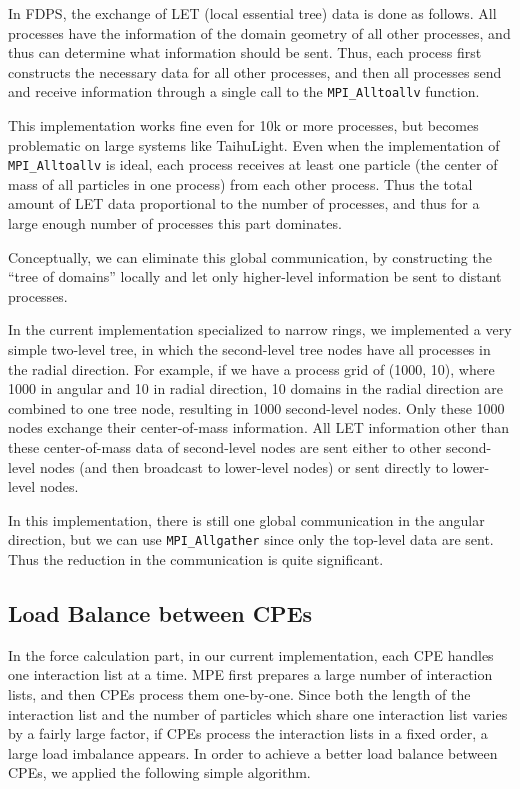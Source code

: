 \documentclass[oribibl]{llncs}
\begin{document}
In FDPS, the exchange of LET (local essential tree) data is done as
follows. All processes have the information of the domain geometry of
all other processes, and thus can determine what information should be
sent. Thus, each process first constructs the necessary data for all
other processes, and then all processes send and receive information
through a single call to the {\tt MPI\_Alltoallv} function.

This implementation works fine even for 10k or more processes, but
becomes problematic on large systems like TaihuLight. Even when the
implementation of {\tt MPI\_Alltoallv} is ideal, each process
receives at least one particle (the center of mass of all particles in
one process) from each other process. Thus the total amount of LET
data proportional to the number of processes, and thus
for a large enough number of processes this part dominates.

Conceptually, we can eliminate this global communication, by
constructing the ``tree of domains'' locally and let only higher-level
information be sent to distant processes.

In the current implementation specialized to narrow rings, we
implemented a very simple two-level tree, in which the second-level
tree nodes have all processes in the radial direction. For example, if we
have a process grid of (1000, 10), where 1000 in angular and 10 in
radial direction, 10 domains in the radial direction are combined to
one tree node, resulting in 1000 second-level nodes. Only these 1000
nodes exchange their center-of-mass information. All LET information
other than these center-of-mass data of second-level nodes are sent
either to other second-level nodes (and then broadcast to
lower-level nodes) or sent directly to lower-level nodes.

In this implementation, there is still one global communication in the
angular direction, but we can use {\tt MPI\_Allgather} since only the
top-level data are sent. Thus the reduction in the communication is
quite significant.


\subsection{Load Balance between CPEs}
\label{subsec:force}

In the force calculation part, in our current implementation, each CPE
handles one interaction list at a time. MPE first prepares a large
number of interaction lists, and then CPEs process them
one-by-one. Since both the length of the interaction list and the
number of particles which share one interaction list varies by a
fairly large factor, if CPEs process the interaction lists in a fixed
order, a large load imbalance appears. In order to achieve a better
load balance between CPEs, we applied the following simple algorithm.
\end{document}
